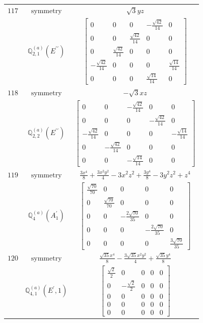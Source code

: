 \documentclass[fleqn,8pt,landscape]{jsarticle}
\begin{document}
\begin{longtable}{ccc}
$ 117 $ & $ \text{symmetry} $ & $ \sqrt{3} y z $ \\
$  $ & $ \mathbb{Q}_{2,1}^{(a)}(E^{\prime\prime}) $ & $ \begin{bmatrix} 0 & 0 & 0 & - \frac{\sqrt{42}}{14} & 0 \\ 0 & 0 & \frac{\sqrt{42}}{14} & 0 & 0 \\ 0 & \frac{\sqrt{42}}{14} & 0 & 0 & 0 \\ - \frac{\sqrt{42}}{14} & 0 & 0 & 0 & \frac{\sqrt{14}}{14} \\ 0 & 0 & 0 & \frac{\sqrt{14}}{14} & 0 \end{bmatrix} $ \\ \hline
$ 118 $ & $ \text{symmetry} $ & $ - \sqrt{3} x z $ \\
$  $ & $ \mathbb{Q}_{2,2}^{(a)}(E^{\prime\prime}) $ & $ \begin{bmatrix} 0 & 0 & - \frac{\sqrt{42}}{14} & 0 & 0 \\ 0 & 0 & 0 & - \frac{\sqrt{42}}{14} & 0 \\ - \frac{\sqrt{42}}{14} & 0 & 0 & 0 & - \frac{\sqrt{14}}{14} \\ 0 & - \frac{\sqrt{42}}{14} & 0 & 0 & 0 \\ 0 & 0 & - \frac{\sqrt{14}}{14} & 0 & 0 \end{bmatrix} $ \\ \hline
$ 119 $ & $ \text{symmetry} $ & $ \frac{3 x^{4}}{8} + \frac{3 x^{2} y^{2}}{4} - 3 x^{2} z^{2} + \frac{3 y^{4}}{8} - 3 y^{2} z^{2} + z^{4} $ \\
$  $ & $ \mathbb{Q}_{4}^{(a)}(A_{1}^{\prime}) $ & $ \begin{bmatrix} \frac{\sqrt{70}}{70} & 0 & 0 & 0 & 0 \\ 0 & \frac{\sqrt{70}}{70} & 0 & 0 & 0 \\ 0 & 0 & - \frac{2 \sqrt{70}}{35} & 0 & 0 \\ 0 & 0 & 0 & - \frac{2 \sqrt{70}}{35} & 0 \\ 0 & 0 & 0 & 0 & \frac{3 \sqrt{70}}{35} \end{bmatrix} $ \\ \hline
$ 120 $ & $ \text{symmetry} $ & $ \frac{\sqrt{35} x^{4}}{8} - \frac{3 \sqrt{35} x^{2} y^{2}}{4} + \frac{\sqrt{35} y^{4}}{8} $ \\
$  $ & $ \mathbb{Q}_{4,1}^{(a)}(E^{\prime},1) $ & $ \begin{bmatrix} \frac{\sqrt{2}}{2} & 0 & 0 & 0 & 0 \\ 0 & - \frac{\sqrt{2}}{2} & 0 & 0 & 0 \\ 0 & 0 & 0 & 0 & 0 \\ 0 & 0 & 0 & 0 & 0 \\ 0 & 0 & 0 & 0 & 0 \end{bmatrix} $ \\ \hline

\end{longtable}
\end{document}
